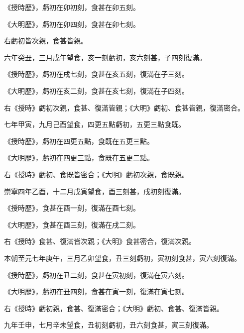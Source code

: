 \begin{pinyinscope}
 《授時歷》，虧初在卯初刻，食甚在卯五刻。



 《大明歷》，虧初在卯四刻，食甚在卯七刻。



 右虧初皆次親，食甚皆親。



 六年癸丑，三月戊午望食，亥一刻虧初，亥六刻甚，子四刻復滿。



 《授時歷》，虧初在戌七刻，食甚在亥五刻，復滿在子三刻。



 《大明歷》，虧初在亥二刻，食甚在亥七刻，復滿在子四刻。



 右《授時》虧初次親，食甚、復滿皆親；《大明》虧初、食甚皆親，復滿密合。



 七年甲寅，九月己酉望食，四更五點虧初，五更三點食既。



 《授時歷》，虧初在四更五點，食既在五更三點。



 《大明歷》，虧初在四更三點，食既在五更二點。



 右《授時》虧初、食既皆密合；《大明》虧初次親，食既親。



 崇寧四年乙酉，十二月戊寅望食，酉三刻甚，戌初刻復滿。



 《授時歷》，食甚在酉一刻，復滿在酉七刻。



 《大明歷》，食甚在酉三刻，復滿在戌二刻。



 右《授時》食甚、復滿皆次親；《大明》食甚密合，復滿次親。



 本朝至元七年庚午，三月乙卯望食，丑三刻虧初，寅初刻食甚，寅六刻復滿。



 《授時歷》，虧初在丑二刻，食甚在寅初刻，復滿在寅六刻。



 《大明歷》，虧初在丑四刻，食甚在寅一刻，復滿在寅七刻。



 右《授時》虧初親，食甚、復滿密合；《大明》虧初、食甚、復滿皆親。



 九年壬申，七月辛未望食，丑初刻虧初，丑六刻食甚，寅三刻復滿。




\end{pinyinscope}
